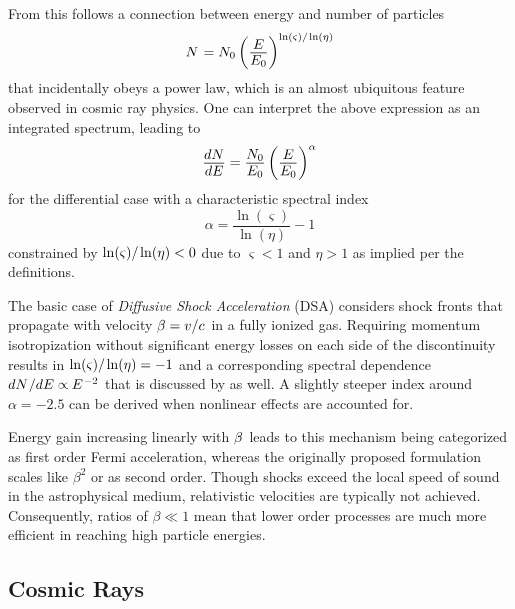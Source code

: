 \begin{spacing}{0.990}
	From this follows a connection between energy and number of particles
	\begin{equation*}
		N \kern+0.9pt = N_0 \left( \frac{\raisebox{-0.3ex}{$E$}}{\raisebox{0.3ex}{$E_0$}} \right)^{\ln(\varsigma) / \kern-0.5pt \ln(\eta)}
	\end{equation*}
	that incidentally obeys a power law, which is an almost ubiquitous feature
	observed in cosmic ray physics. One can interpret the above expression as an integrated spectrum, leading to
	\begin{equation*}
		\frac{\raisebox{-0.3ex}{$dN$}}{\raisebox{0.3ex}{$dE$}} = \frac{\raisebox{-0.3ex}{$N_0$}}{\raisebox{0.3ex}{$E_0$}}
		\left( \frac{\raisebox{-0.3ex}{$E$}}{\raisebox{0.3ex}{$E_0$}} \right)^\alpha
	\end{equation*}
	for the differential case with a characteristic spectral index
	\begin{equation*}
		\alpha = \frac{\ln(\varsigma)}{\ln(\eta)} - 1
	\end{equation*}
	constrained by $\ln(\varsigma) / \kern-0.5pt \ln(\eta) < 0$ due to $\varsigma < 1$ and $\eta > 1$ as implied per the definitions.
	
	The basic case of \emph{Diffusive Shock Acceleration} (DSA) considers shock fronts that propagate with velocity
	$\kern-0.5pt \beta = v / c \kern+1.0pt$ in a fully ionized gas. Requiring momentum isotropization without significant energy losses
	on each side of the discontinuity results in $\ln(\varsigma) / \kern-0.5pt \ln(\eta) = -1$ and a corresponding spectral dependence
	$dN \kern+0.5pt / dE \propto \kern-0.5pt E^{\kern+0.5pt -2}$ that is discussed by \cite{Longair_2011} as well. A slightly steeper
	index around $\alpha = \num{-2.5}$ can be derived when nonlinear effects are accounted for.
	
	Energy gain increasing linearly with $\kern-0.5pt \beta \kern+1.0pt$ leads to this mechanism being categorized as first order Fermi
	acceleration, whereas the originally proposed formulation scales like $\beta^2$ or as second order. Though shocks exceed the local
	speed of sound in the astrophysical medium, relativistic velocities are typically not achieved. Consequently, ratios of $\beta \ll 1$
	mean that lower order processes are much more efficient in reaching high particle energies.


	\enlargethispage*{2\baselineskip}


	\subsection{Cosmic Rays}
	\label{sub:rays}
	

\end{spacing}
